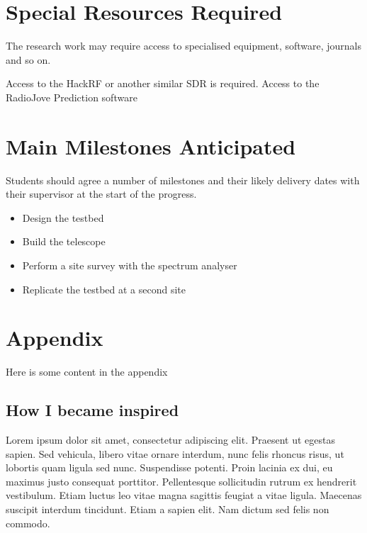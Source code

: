 \documentclass[runningheads,a4paper]{llncs}
\begin{document}
\section*{Special Resources Required}
%
The research work may require access to specialised equipment, software, journals and so on.

Access to the HackRF or another similar SDR is required.
Access to the RadioJove Prediction software
%
%
\newpage
\section*{Main Milestones Anticipated}
%
Students should agree a number of milestones and their likely delivery dates with their supervisor at the start of the progress.


\begin{itemize}
  \item Design the testbed
  \item Build the telescope
  \item Perform a site survey with the spectrum analyser
  \item Replicate the testbed at a second site
\end{itemize}


%
\printglossaries
%
\newpage
\listoftables
{}
%


%
\newpage
%
\appendix
\section*{Appendix}
Here is some content in the appendix

\begin{subappendices}
\subsection*{How I became inspired}
Lorem ipsum dolor sit amet, consectetur adipiscing elit. Praesent ut egestas sapien. Sed vehicula, libero vitae ornare interdum, nunc felis rhoncus risus, ut lobortis quam ligula sed nunc. Suspendisse potenti. Proin lacinia ex dui, eu maximus justo consequat porttitor. Pellentesque sollicitudin rutrum ex hendrerit vestibulum. Etiam luctus leo vitae magna sagittis feugiat a vitae ligula. Maecenas suscipit interdum tincidunt. Etiam a sapien elit. Nam dictum sed felis non commodo.

%
\end{subappendices}
\end{document}
